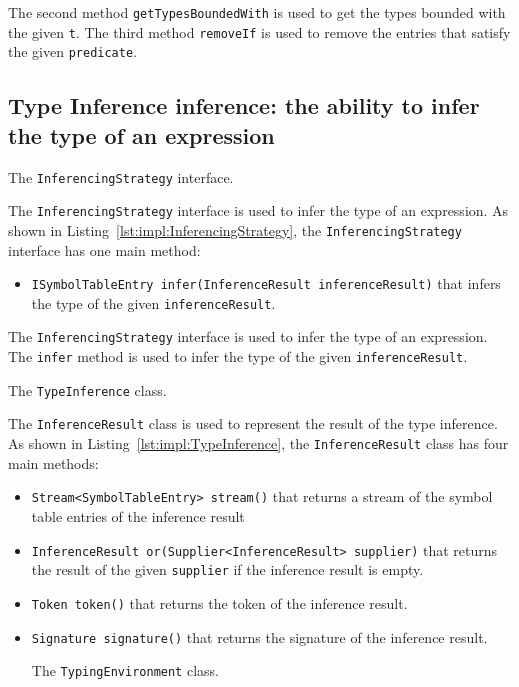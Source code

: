 The second method \texttt{getTypesBoundedWith} is used to get the types bounded with the given \texttt{t}. The third method \texttt{removeIf} is used to remove the entries that satisfy the given \texttt{predicate}.

\subsection{Type Inference inference: the ability to infer the type of an expression}\label{subsec:impl:TypeInference}

\begin{Listing}[tbh]
    \centering
    \caption{The \texttt{InferencingStrategy} interface.}
    \label{lst:impl:InferencingStrategy}
\end{Listing}

The \texttt{InferencingStrategy} interface is used to infer the type of an expression. As shown in Listing~\ref{lst:impl:InferencingStrategy}, the \texttt{InferencingStrategy} interface has one main method:
\begin{itemize}
    \item \texttt{ISymbolTableEntry infer(InferenceResult inferenceResult)} that infers the type of the given \texttt{inferenceResult}.
\end{itemize}

The \texttt{InferencingStrategy} interface is used to infer the type of an expression. The \texttt{infer} method is used to infer the type of the given \texttt{inferenceResult}.

\begin{Listing}[tbh]
    \centering
    \caption{The \texttt{TypeInference} class.}
    \label{lst:impl:TypeInference}
\end{Listing}

The \texttt{InferenceResult} class is used to represent the result of the type inference. As shown in Listing~\ref{lst:impl:TypeInference}, the \texttt{InferenceResult} class has four main methods:
\begin{itemize}
    \item \texttt{Stream<SymbolTableEntry> stream()} that returns a stream of the symbol table entries of the inference result
    \item \texttt{InferenceResult or(Supplier<InferenceResult> supplier)} that returns the result of the given \texttt{supplier} if the inference result is empty.
    \item \texttt{Token token()} that returns the token of the inference result.
    \item \texttt{Signature signature()} that returns the signature of the inference result.


\begin{Listing}[t]
    \centering
    \caption{The \texttt{TypingEnvironment} class.}
    \label{lst:impl:TypingEnvironment}
\end{Listing}

\end{itemize}

